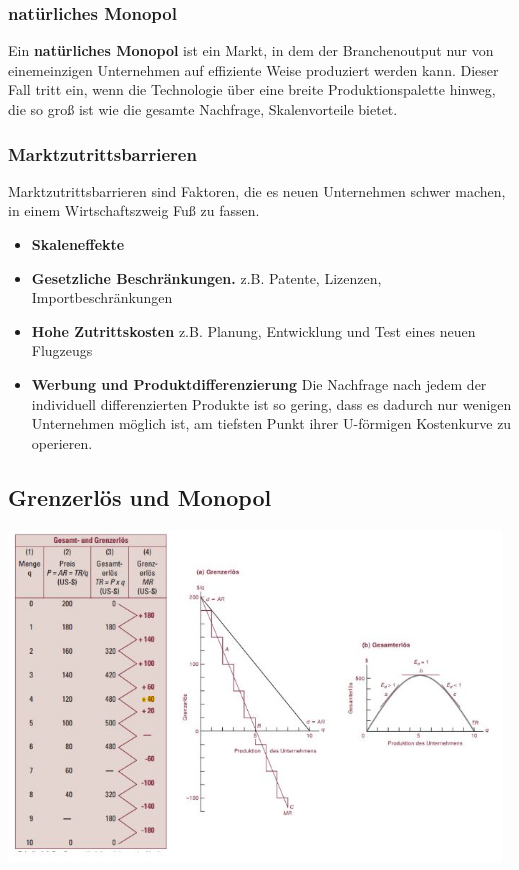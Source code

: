 \documentclass[10pt]{scrartcl}
\begin{document}
\subsubsection{natürliches Monopol}
Ein {\bf natürliches Monopol} ist ein Markt, in dem der Branchenoutput nur von einemeinzigen Unternehmen auf effiziente Weise produziert werden kann. Dieser Fall tritt ein, wenn die Technologie über eine breite Produktionspalette hinweg, die so groß ist wie die gesamte Nachfrage, Skalenvorteile bietet.

\subsubsection{Marktzutrittsbarrieren}
Marktzutrittsbarrieren sind Faktoren, die es neuen Unternehmen schwer machen, in einem Wirtschaftszweig Fuß zu fassen.
\begin{itemize}
\item {\bf Skaleneffekte}
\item {\bf Gesetzliche Beschränkungen.} z.B. Patente, Lizenzen, Importbeschränkungen
\item {\bf Hohe Zutrittskosten } z.B. Planung, Entwicklung und Test eines neuen Flugzeugs
\item {\bf Werbung und Produktdifferenzierung} Die Nachfrage nach jedem der individuell differenzierten Produkte ist so gering, dass es dadurch nur wenigen Unternehmen möglich ist, am tiefsten Punkt ihrer U-förmigen Kostenkurve zu operieren.
\end{itemize} 

\subsection{Grenzerlös und Monopol}
\includegraphics[width=0.98\textwidth]{img/grenzerlos.jpg}
\end{document}

